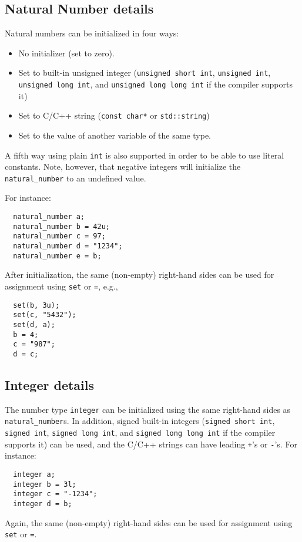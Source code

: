 \documentclass[a4paper]{article}
\begin{document}
\subsection{Natural Number details}

Natural numbers can be initialized in four ways:
\begin{itemize}
\item No initializer (set to zero).
\item Set to built-in unsigned integer (\texttt{unsigned short int}, \texttt{unsigned int}, \texttt{unsigned long int}, and \texttt{unsigned long long int} if the compiler supports it)
\item Set to C/C++ string (\texttt{const char*} or \texttt{std::string})
\item Set to the value of another variable of the same type.
\end{itemize}
A fifth way using plain \texttt{int} is also supported in order to be able to use literal constants. Note, however, that negative integers will initialize the \texttt{natural\_number} to an undefined value.

For instance:
\begin{verbatim}
  natural_number a;
  natural_number b = 42u;
  natural_number c = 97;
  natural_number d = "1234";
  natural_number e = b;
\end{verbatim}

After initialization, the same (non-empty) right-hand sides can be used for assignment using \texttt{set} or \texttt{=}, e.g.,
\begin{verbatim}
  set(b, 3u);
  set(c, "5432");
  set(d, a);
  b = 4;
  c = "987";
  d = c;
\end{verbatim}

\subsection{Integer details}

The number type \texttt{integer} can be initialized using the same right-hand sides as \texttt{natural\_number}s. In addition, signed built-in integers (\texttt{signed short int}, \texttt{signed int}, \texttt{signed long int}, and \texttt{signed long long int} if the compiler supports it) can be used, and the C/C++ strings can have leading \texttt{+}'s or \texttt{-}'s. For instance:
\begin{verbatim}
  integer a;
  integer b = 3l;
  integer c = "-1234";
  integer d = b;
\end{verbatim}
Again, the same (non-empty) right-hand sides can be used for assignment using \texttt{set} or \texttt{=}.
\end{document}
